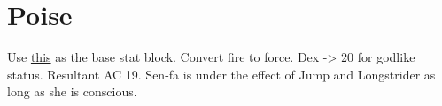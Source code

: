 \section{Poise}\label{sec:poise}

Use \href{https://i.imgur.com/HIvPzSj.jpg}{this} as the base stat block.
Convert fire to force.
Dex -> 20 for godlike status.
Resultant AC 19.
Sen-fa is under the effect of Jump and Longstrider as long as she is conscious.
